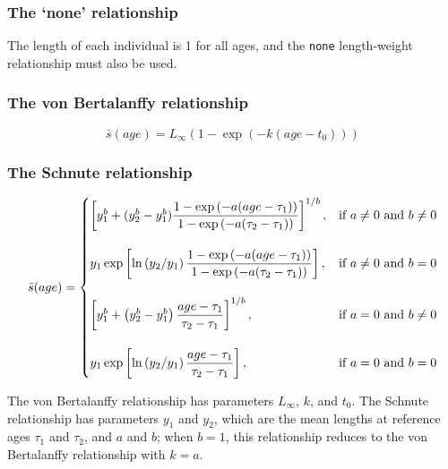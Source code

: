 \subsubsection{The `none' relationship}\label{sec:AgeLength-None}

The length of each individual is 1 for all ages, and the \texttt{none} length-weight relationship must also be used.

\subsubsection{The von Bertalanffy relationship}\label{sec:AgeLength-VonBertalanffy}

\begin{equation}
\bar{s}(age)= L_\infty \left( 1 - \exp \left( -k \left(age-t_0 \right) \right) \right)
\end{equation}

\subsubsection{The Schnute relationship}\label{sec:AgeLength-Schnute}

\begin{equation}
\bar{s}(age)=\displaystyle\begin{cases}
  \left[ y_1^b + (y_2^b - y_1^b) \dfrac{1-\exp \left(-a(age - \tau_1) \right)}{1-\exp \left(-a(\tau_2 - \tau_1) \right)} \right]^{1/b}, & \text{if $a\ne0$ and $b\ne0$} \\
  \AddVspace
  y_1 \exp \left[ \ln \left( y_2 / y_1 \right) \dfrac{1-\exp \left(-a(age - \tau_1) \right)}{1-\exp \left(-a(\tau_2 - \tau_1) \right)} \right], & \text{if $a\ne0$ and $b=0$} \\
  \AddVspace
  \left[ y_1^b + \left( y_2^b - y_1^b \right) \dfrac{age-\tau_1}{\tau_2 - \tau_1} \right]^{1/b}, & \text{if $a=0$ and $b\ne0$} \\
  \AddVspace
  y_1 \exp \left[ \ln \left( y_2/y_1 \right) \dfrac{age-\tau_1}{\tau_2 - \tau_1} \right] , & \text{if $a=0$ and $b=0$} \\
  \end{cases}
\end{equation}

The von Bertalanffy relationship has parameters $L_\infty$, $k$, and $t_0$. The Schnute relationship \citep{836} has parameters $y_1$ and $y_2$, which are the mean lengths at reference ages $\tau_1$ and $\tau_2$, and $a$ and $b$; when $b=1$, this relationship reduces to the von Bertalanffy relationship with $k=a$.

